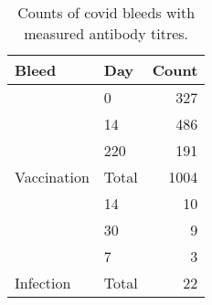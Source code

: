 \begin{table}

\caption{\label{tab:bleed-counts-covid}Counts of covid bleeds with measured antibody titres.}
\centering
\begin{tabular}[t]{llr}
\toprule
Bleed & Day & Count\\
\midrule
 & 0 & 327\\

 & 14 & 486\\

 & 220 & 191\\

\multirow{-4}{*}{\raggedright\arraybackslash Vaccination} & Total & 1004\\
\cmidrule{1-3}
 & 14 & 10\\

 & 30 & 9\\

 & 7 & 3\\

\multirow{-4}{*}{\raggedright\arraybackslash Infection} & Total & 22\\
\bottomrule
\end{tabular}
\end{table}
